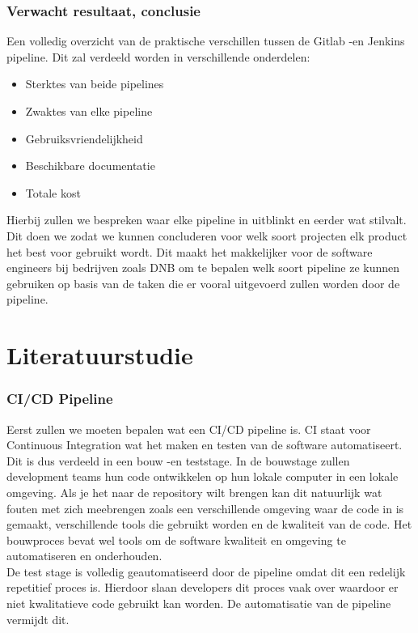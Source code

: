 \section{Verwacht resultaat, conclusie}%
\label{sec:verwachte_resultaten}
Een volledig overzicht van de praktische verschillen tussen de Gitlab -en Jenkins pipeline. Dit zal verdeeld worden in verschillende onderdelen:

\begin{itemize}
    \item Sterktes van beide pipelines
    \item Zwaktes van elke pipeline
    \item Gebruiksvriendelijkheid
    \item Beschikbare documentatie
    \item Totale kost
\end{itemize}

Hierbij zullen we bespreken waar elke pipeline in uitblinkt en eerder wat stilvalt. Dit doen we zodat we kunnen concluderen voor welk soort projecten elk product het best voor gebruikt wordt. Dit maakt het makkelijker voor de software engineers bij bedrijven zoals DNB om te bepalen welk soort pipeline ze kunnen gebruiken op basis van de taken die er vooral uitgevoerd zullen worden door de pipeline. 


\part{Literatuurstudie}
\section{CI/CD Pipeline}
Eerst zullen we moeten bepalen wat een CI/CD pipeline is. CI staat voor Continuous Integration wat het maken en testen van de software automatiseert. Dit is dus verdeeld in een bouw -en teststage. In de bouwstage zullen development teams hun code ontwikkelen op hun lokale computer in een lokale omgeving. Als je het naar de repository wilt brengen kan dit natuurlijk wat fouten met zich meebrengen zoals een verschillende omgeving waar de code in is gemaakt, verschillende tools die gebruikt worden en de kwaliteit van de code. Het bouwproces bevat wel tools om de software kwaliteit en omgeving te automatiseren en onderhouden. \autocite{Fosco2022} \\

De test stage is volledig geautomatiseerd door de pipeline omdat dit een redelijk repetitief proces is. Hierdoor slaan developers dit proces vaak over waardoor er niet kwalitatieve code gebruikt kan worden. De automatisatie van de pipeline vermijdt dit. \autocite{Fosco2022} \\

